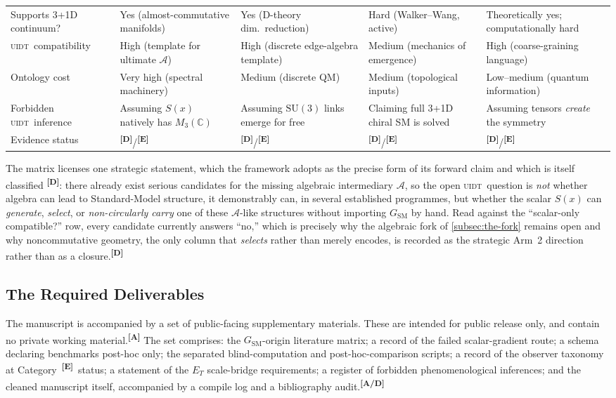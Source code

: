 \documentclass[12pt,a4paper,twoside]{article}
\theoremstyle{plain}
\theoremstyle{definition}
\theoremstyle{remark}
\newcommand{\UIDT}{\textsc{uidt}}
\newcommand{\catmark}[1]{\textsuperscript{\textsf{\textbf{[#1]}}}}
\begin{document}
{\begin{longtable}{p{} p{} p{} p{} p{}}
Supports 3+1D continuum? & Yes (almost-commutative manifolds) & Yes (D-theory dim.\ reduction) & Hard (Walker--Wang, active) & Theoretically yes; computationally hard \\
\UIDT\ compatibility & High (template for ultimate $\mathcal{A}$) & High (discrete edge-algebra template) & Medium (mechanics of emergence) & High (coarse-graining language) \\
Ontology cost & Very high (spectral machinery) & Medium (discrete QM) & Medium (topological inputs) & Low--medium (quantum information) \\
Forbidden \UIDT\ inference & Assuming $S(x)$ natively has $M_3(\mathbb{C})$ & Assuming $\mathrm{SU}(3)$ links emerge for free & Claiming full 3+1D chiral SM is solved & Assuming tensors \emph{create} the symmetry \\
Evidence status & \catmark{D}/\catmark{E} & \catmark{D}/\catmark{E} & \catmark{D}/\catmark{E} & \catmark{D}/\catmark{E} \\
\bottomrule
\end{longtable}
}

\noindent The matrix licenses one strategic statement, which the framework adopts as the precise form of its forward claim and which is itself classified \catmark{D}: there already exist serious candidates for the missing algebraic intermediary $\mathcal{A}$, so the open \UIDT\ question is \emph{not} whether algebra can lead to Standard-Model structure, it demonstrably can, in several established programmes, but whether the scalar $S(x)$ can \emph{generate}, \emph{select}, or \emph{non-circularly carry} one of these $\mathcal{A}$-like structures without importing $G_{\mathrm{SM}}$ by hand. Read against the ``scalar-only compatible?'' row, every candidate currently answers ``no,'' which is precisely why the algebraic fork of \cref{subsec:the-fork} remains open and why noncommutative geometry, the only column that \emph{selects} rather than merely encodes, is recorded as the strategic Arm~2 direction rather than as a closure.\catmark{D}

\subsection{The Required Deliverables}
\label{subsec:required-deliverables}

The manuscript is accompanied by a set of public-facing supplementary materials. These are intended for public release only, and contain no private working material.\catmark{A} The set comprises: the $G_{\mathrm{SM}}$-origin literature matrix; a record of the failed scalar-gradient route; a schema declaring benchmarks post-hoc only; the separated blind-computation and post-hoc-comparison scripts; a record of the observer taxonomy at Category~\catmark{E}\ status; a statement of the $E_T$ scale-bridge requirements; a register of forbidden phenomenological inferences; and the cleaned manuscript itself, accompanied by a compile log and a bibliography audit.\catmark{A/D}
\end{document}
